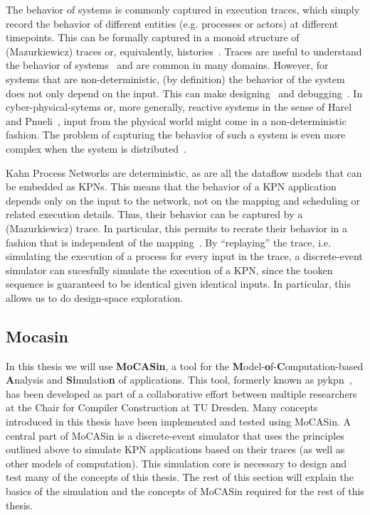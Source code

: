 The behavior of systems is commonly captured in execution traces, which simply record the behavior of different entities (e.g. processes or actors) at different timepoints. This can be formally captured in a monoid structure of (Mazurkiewicz) traces or, equivalently, histories~\cite{bookoftraces}. Traces are useful to understand the behavior of systems~\cite{vampir} and are common in many domains. However, for systems that are non-deterministic, (by definition) the behavior of the system does not only depend on the input. This can make designing~\cite{lee_problem_with_threads} and debugging~\cite{murillo}. In cyber-physical-sytems or, more generally, reactive systems in the sense of Harel and Pnueli~\cite{harel_pnueli_reactive}, input from the physical world might come in a non-deterministic fashion. The problem of capturing the behavior of such a system is even more complex when the system is distributed~\cite{shaver_phdthesis}. 

Kahn Process Networks are deterministic, as are all the dataflow models that can be embedded as KPNs.
This means that the behavior of a KPN application depends only on the input to the network, not on the mapping and scheduling or related execution details.
Thus, their behavior can be captured by a (Mazurkiewicz) trace.
In particular, this permits to recrate their behavior in a fashion that is independent of the mapping~\cite{find_proper_references}.
By ``replaying'' the trace, i.e. simulating the execution of a process for every input in the trace, a discrete-event simulator can sucesfully simulate the execution of a KPN, since the tooken sequence is guaranteed to be identical given identical inputs. In particular, this allows us to do design-space exploration.

\subsection{Mocasin}

In this thesis we will use \textbf{MoCASin}, a tool for the \textbf{M}odel-\textbf{o}f-\textbf{C}omputation-based \textbf{A}nalysis and \textbf{Si}mulatio\textbf{n} of applications. This tool, formerly known as pykpn~\cite{goens_mcsoc18}, has been developed as part of a collaborative effort between multiple researchers at the Chair for Compiler Construction at TU Dresden. Many concepts introduced in this thesis have been implemented and tested using MoCASin. A central part of MoCASin is a discrete-event simulator that uses the principles outlined above to simulate KPN applications based on their traces (as well as other models of computation). This simulation core is necessary to design and test many of the concepts of this thesis. The rest of this section will explain the basics of the simulation and the concepts of MoCASin required for the rest of this thesis.


